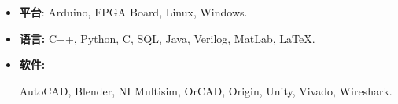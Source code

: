 \begin{itemize}
    \item 
    \textbf{平台}: Arduino, FPGA Board, Linux, Windows.
    \item 
    \textbf{语言:} C++, Python, C, SQL, Java, Verilog, MatLab, \LaTeX.
    \item 
    \textbf{软件:} 
    \begin{minipage}[t]{\skillwidth}
        AutoCAD, Blender, NI Multisim, OrCAD, Origin, 
        Unity, Vivado, Wireshark.
    \end{minipage}
\end{itemize}
